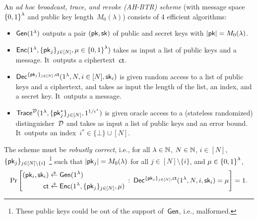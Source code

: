 \begin{definition}[AH-BTR]\label{def:ahbtr}
An \emph{ad hoc broadcast, trace, and revoke (AH-BTR) scheme}
(with message space~${\{0,1\}}^\lambda$ and public key length~$M_0(\lambda)$)
consists of 4 efficient algorithms:
\begin{itemize}
\item $\Gen(1^\lambda)$ outputs a pair $(\pk,\sk)$ of public and secret keys
with ${|\pk|=M_0(\lambda)}$.
\item $\Enc(1^\lambda,\{\pk_j\}_{j\in[N]},{\mu\in\bit^\lambda})$
takes as input
a list of public keys and a message.
It~outputs a ciphertext~$\ct$.
\item $\Dec^{\{\pk_j\}_{j\in[N]},\ct}(1^\lambda,N,i\in[N],\sk_i)$
is given random access to a list of public keys and a ciphertext, and
takes as input
the length of the list,
an index, and
a secret key.
It~outputs a message.
\item $\Trace^\scriptD(1^\lambda,\{\pk^\ast_j\}_{j\in[N]},1^{1/\epsilon^\ast})$
is given oracle access to a (stateless randomized) distinguisher~${\mathcal{D}}$ and takes as input
a list of public keys and an error bound.
It~outputs an index~${i^\ast\in\{\bot\}\cup[N]}$.
\end{itemize}
The scheme must be \emph{robustly correct}, i.e., for all
${\lambda\in{\mathbb{N}}}$,
${N\in{\mathbb{N}}}$,
${i\in[N]}$,\WideNarrow{}{\linebreak[4]}
$\{\pk_j\}_{j\in[N]\setminus\{i\}}$%
\footnote{These public keys could be out of the support of~$\Gen$,
i.e., malformed.}
such that ${|\pk_j|=M_0(\lambda)}$ for all ${j\in[N]\setminus\{i\}}$, and
${\mu\in{\{0,1\}}^\lambda}$,
\begin{align*}
\Pr\left[
\begin{aligned}
(\pk_i,\sk_i)&{}\draws\Gen(1^\lambda)\\
\ct&{}\draws\Enc(1^\lambda,\{\pk_j\}_{j\in[N]},\mu)
\end{aligned}
\::\:
\Dec^{\{\pk_j\}_{j\in[N]},\ct}(1^\lambda,N,i,\sk_i)=\mu
\right]=1.
\end{align*}
\end{definition}
